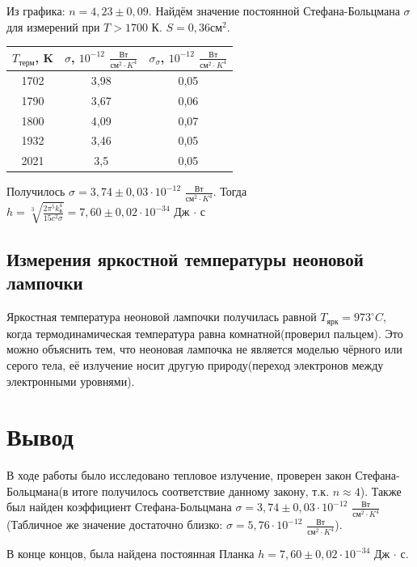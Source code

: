 \documentclass[a4paper,12pt]{article}
\begin{document}
Из графика: $n = 4,23 \pm 0,09$.
Найдём значение постоянной Стефана-Больцмана $\sigma$ для измерений при $T > 1700$ К. $S = 0,36 \text{см}^2$.

\begin{table}[H]
    \centering
    \begin{tabular}{|c|c|c|}
        \hline
        $T_\text{терм}$, K & $\sigma$, $10^{-12}$ $\frac{\text{Вт}}{\text{см}^2 \cdot K^4}$ & $\sigma_\sigma$, $10^{-12}$ $\frac{\text{Вт}}{\text{см}^2 \cdot K^4}$ \\
        \hline
        1702 & 3,98 & 0,05 \\
        \hline
        1790 & 3,67 & 0,06 \\
        \hline
        1800 & 4,09 & 0,07 \\
        \hline
        1932 & 3,46 & 0,05 \\
        \hline
        2021 & 3,5 & 0,05 \\
        \hline
    \end{tabular}
\end{table}
Получилось $\sigma = 3,74 \pm 0,03 \cdot 10^{-12}$ $\frac{\text{Вт}}{\text{см}^2 \cdot K^4}$.
Тогда $h = \sqrt[3]{\frac{2 \pi^5 k_\text{Б}^4}{15c^2 \sigma}} = 7,60 \pm 0,02 \cdot 10^{-34}$ Дж $\cdot$ с 
\subsection*{Измерения яркостной температуры неоновой лампочки}
Яркостная температура неоновой лампочки получилась равной $T_\text{ярк} = 973^\circ C$, когда термодинамическая температура равна комнатной(проверил пальцем). Это можно объяснить тем, что неоновая лампочка не является моделью чёрного или серого тела, её излучение носит другую природу(переход электронов между электронными уровнями).
\newpage
\section{Вывод}
В ходе работы было исследовано тепловое излучение, проверен закон Стефана-Больцмана(в итоге получилось соответствие данному закону, т.к. $n \approx 4$). Также был найден коэффициент Стефана-Больцмана $\sigma = 3,74 \pm 0,03 \cdot 10^{-12}$ $\frac{\text{Вт}}{\text{см}^2 \cdot K^4}$(Табличное же значение достаточно близко: $\sigma = 5,76 \cdot 10^{-12}$ $\frac{\text{Вт}}{\text{см}^2 \cdot K^4}$). 

В конце концов, была найдена постоянная Планка $h = 7,60 \pm 0,02 \cdot 10^{-34}$ Дж $\cdot$ с.
\end{document}
